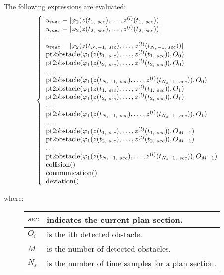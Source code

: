 \documentclass[letterpaper,10pt,english]{sphinxmanual}
\begin{document}
\begin{fulllineitems}
\begin{fulllineitems}
The following expressions are evaluated:
\begin{gather}
\begin{split}\left\lbrace\begin{array}{lcl}
u_{max} - |\varphi_2(z(t_{1,\ sec}),\dotsc,z^{(l)}(t_{1,\ sec}))|\\
u_{max} - |\varphi_2(z(t_{2,\ sec}),\dotsc,z^{(l)}(t_{2,\ sec}))|\\
\dotsc\\
u_{max} - |\varphi_2(z(t_{N_s-1,\ sec}),\dotsc,z^{(l)}(t_{N_s-1,\ sec}))|\\
\mathrm{pt2obstacle}(\varphi_1(z(t_{1,\ sec}),\dotsc,z^{(l)}(t_{1,\ sec})), O_0)\\
\mathrm{pt2obstacle}(\varphi_1(z(t_{2,\ sec}),\dotsc,z^{(l)}(t_{2,\ sec})), O_0)\\
\dotsc\\
\mathrm{pt2obstacle}(\varphi_1(z(t_{N_s-1,\ sec}),
\dotsc,z^{(l)}(t_{N_s-1,\ sec})), O_0)\\
\mathrm{pt2obstacle}(\varphi_1(z(t_{1,\ sec}),\dotsc,z^{(l)}(t_{1,\ sec})), O_1)\\
\mathrm{pt2obstacle}(\varphi_1(z(t_{2,\ sec}),\dotsc,z^{(l)}(t_{2,\ sec})), O_1)\\
\dotsc\\
\mathrm{pt2obstacle}(\varphi_1(z(t_{N_s-1,\ sec}),
\dotsc,z^{(l)}(t_{N_s-1,\ sec})), O_1)\\
\dotsc\\
\mathrm{pt2obstacle}(\varphi_1(z(t_{1,\ sec}),
\dotsc,z^{(l)}(t_{1,\ sec})), O_{M-1})\\
\mathrm{pt2obstacle}(\varphi_1(z(t_{2,\ sec}),
\dotsc,z^{(l)}(t_{2,\ sec})), O_{M-1})\\
\dotsc\\
\mathrm{pt2obstacle}(\varphi_1(z(t_{N_s-1,\ sec}),
\dotsc,z^{(l)}(t_{N_s-1,\ sec})), O_{M-1})\\
\mathrm{collision()}\\
\mathrm{communication()}\\
\mathrm{deviation()}
\end{array}\right.\end{split}\notag
\end{gather}\begin{description}
\item[{where:}] \leavevmode
\begin{tabulary}{\linewidth}{|L|L|}
\hline

\(sec\)
 & 
indicates the current plan section.
\\
\hline
\(O_i\)
 & 
is the ith detected obstacle.
\\
\hline
\(M\)
 & 
is the number of detected obstacles.
\\
\hline
\(N_s\)
 & 
is the number of time samples for a plan section.
\\
\hline\end{tabulary}



\end{description}
\end{fulllineitems}
\end{fulllineitems}
\end{document}
